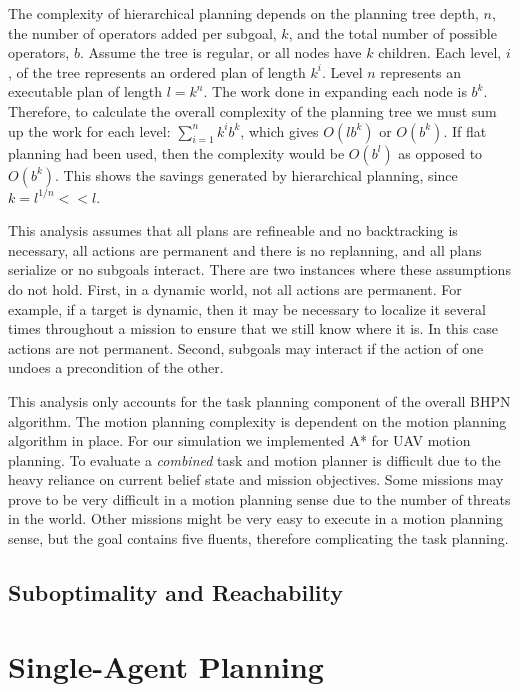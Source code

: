 \documentclass[12pt]{article}
\begin{document}
The complexity of hierarchical planning depends on the planning tree depth, $n$, the number of operators added per subgoal, $k$, and the total number of possible operators, $b$. Assume the tree is regular, or all nodes have $k$ children. Each level, $i$, of the tree represents an ordered plan of length $k^{i}$. Level $n$ represents an executable plan of length $l = k^{n}$. The work done in expanding each node is $b^{k}$. Therefore, to calculate the overall complexity of the planning tree we must sum up the work for each level: $ \sum_{i=1}^{n} k^{i}b^{k}$, which gives  $O(lb^{k})$ or $O(b^{k})$. If flat planning had been used, then the complexity would be $O(b^{l})$ as opposed to $O(b^{k})$. This shows the savings generated by hierarchical planning, since $k=l^{1/n} << l$. 

This analysis assumes that all plans are refineable and no backtracking is necessary, all actions are permanent and there is no replanning, and all plans serialize or no subgoals interact. There are two instances where these assumptions do not hold. First, in a dynamic world, not all actions are permanent. For example, if a target is dynamic, then it may be necessary to localize it several times throughout a mission to ensure that we still know where it is. In this case actions are not permanent. Second, subgoals may interact if the action of one undoes a precondition of the other. 

This analysis only accounts for the task planning component of the overall BHPN algorithm. The motion planning complexity is dependent on the motion planning algorithm in place. For our simulation we implemented A* for UAV motion planning. To evaluate a \textit{combined} task and motion planner is difficult due to the heavy reliance on current belief state and mission objectives. Some missions may prove to be very difficult in a motion planning sense due to the number of threats in the world. Other missions might be very easy to execute in a motion planning sense, but the goal contains five fluents, therefore complicating the task planning. 

\subsection{Suboptimality and Reachability}

\section{Single-Agent Planning}
\end{document}
